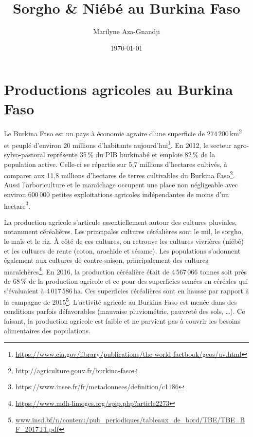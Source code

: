 \documentclass[a4paper,11pt]{article}
\begin{document}
\title{Sorgho \& Niébé au Burkina Faso}
\author{Marilyne Aza-Gnandji}
\date{\today}

\maketitle
\tableofcontents

\section{Productions agricoles au Burkina Faso}

Le Burkina Faso est un pays à économie agraire
\cite{Koulibi_FideleZONGO} d'une superficie de
274\,200\,km\textsuperscript{2} et peuplé d'environ 20 millions
d'habitants
aujourd'hui\footnote{\url{https://www.cia.gov/library/publications/the-world-factbook/geos/uv.html}}. En
2012, le secteur agro-sylvo-pastoral représente 35\,\% du PIB
burkinabé et emploie 82\,\% de la population active. Celle-ci se
répartie sur 5,7 millions d'hectares cultivés, à comparer aux 11,8
millions d'hectares de terres cultivables du Burkina
Faso\footnote{\url{http://agriculture.gouv.fr/burkina-faso}}. Aussi
l'arboriculture et le maraîchage occupent une place non négligeable
avec environ 600\,000 petites exploitations agricoles indépendantes de
moins d'un
hectare\footnote{https://www.insee.fr/fr/metadonnees/definition/c1186}.

La production agricole s'articule essentiellement autour des cultures
pluviales, notamment céréalières. Les principales cultures céréalières
sont le mil, le sorgho, le maïs et le riz. À côté de ces cultures, on
retrouve les cultures vivrières (niébé) et les cultures de rente
(coton, arachide et sésame). Les populations s'adonnent également aux
cultures de contre-saison, principalement des cultures
maraîchères\footnote{\url{https://www.mdh-limoges.org/spip.php?article2273}}.
En 2016, la production céréalière était de 4\,567\,066 tonnes soit
près de 68\,\% de la production agricole et ce pour des superficies
semées en céréales qui s'évaluaient à 4\,017\,586\,ha. Ces superficies
céréalières sont en hausse par rapport à la campagne de
2015\footnote{\url{www.insd.bf/n/contenu/pub_periodiques/tableaux_de_bord/TBE/TBE_BF_2017T1.pdf}}. L'activité
agricole au Burkina Faso est menée dans des conditions parfois
défavorables (mauvaise pluviométrie, pauvreté des sols, \ldots{}). Ce
faisant, la production agricole est faible et ne parvient pas à
couvrir les besoins alimentaires des populations.
\end{document}
